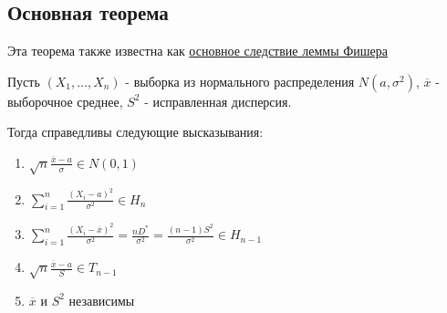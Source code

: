 \documentclass[12pt]{article}
\begin{document}
\subsection{Основная теорема}

Эта теорема также известна как \href{https://tvims.nsu.ru/chernova/ms/lec/node37.html}{основное следствие леммы Фишера}

\begin{MyTheorem}
    \Ths Пусть $(X_1, \dots, X_n)$ - выборка из нормального распределения $N(a, \sigma^2)$, $\overline{x}$ - выборочное среднее, $S^2$ - исправленная дисперсия.

    Тогда справедливы следующие высказывания:

    \begin{enumerate}
        \item $\sqrt{n} \frac{\overline{x} - a}{\sigma} \in N(0, 1)$
        
        \item $\sum_{i = 1}^n \frac{(X_i - a)^2}{\sigma^2} \in H_n$
        
        \item $\sum_{i = 1}^n \frac{(X_i - \overline{x})^2}{\sigma^2} = \frac{n D^*}{\sigma^2} = \frac{(n - 1) S^2}{\sigma^2} \in H_{n - 1}$

        \item $\sqrt{n} \frac{\overline{x} - a}{S} \in T_{n - 1}$
        
        \item $\overline{x}$ и $S^2$ независимы
    \end{enumerate}
\end{MyTheorem}
\end{document}
